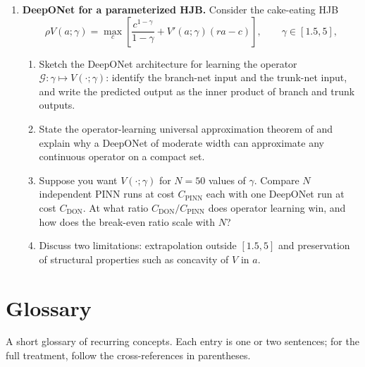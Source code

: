 \documentclass[11pt,a4paper]{report}
\begin{document}
\begin{enumerate}[itemsep=4pt, leftmargin=*]
\begin{enumerate}[label=(\roman*), itemsep=2pt]
\end{enumerate}
Report the wall-clock time of each step, total pipeline time, estimation errors, and a comparison to a naive SMM that re-solves the DEQN at each candidate $(\beta,\alpha)$.  Evaluate whether the surrogate-based optimization is faster after accounting for the one-time GP fitting overhead and whether its accuracy is comparable.  Bonus: bootstrap confidence intervals for $(\hat\beta,\hat\alpha)$ using the parametric bootstrap of Exercise~\ref{ex:ch10:6}.
\item\label{ex:ch12:6} \textbf{DeepONet for a parameterized HJB.}  Consider the cake-eating HJB
\[
\rho V(a; \gamma) = \max_c \left[\frac{c^{1-\gamma}}{1-\gamma} + V'(a; \gamma)(ra - c)\right],
\qquad \gamma \in [1.5,5],
\]
\begin{enumerate}[label=(\roman*), itemsep=2pt]
\item Sketch the DeepONet architecture for learning the operator $\mathcal{G}: \gamma \mapsto V(\cdot;\gamma)$: identify the branch-net input and the trunk-net input, and write the predicted output as the inner product of branch and trunk outputs.
\item State the operator-learning universal approximation theorem of \citet{lu2021learning} and explain why a DeepONet of moderate width can approximate any continuous operator on a compact set.
\item Suppose you want $V(\cdot;\gamma)$ for $N=50$ values of $\gamma$.  Compare $N$ independent PINN runs at cost $C_\mathrm{PINN}$ each with one DeepONet run at cost $C_\mathrm{DON}$.  At what ratio $C_\mathrm{DON}/C_\mathrm{PINN}$ does operator learning win, and how does the break-even ratio scale with $N$?
\item Discuss two limitations: extrapolation outside $[1.5,5]$ and preservation of structural properties such as concavity of $V$ in $a$.
\end{enumerate}
\end{enumerate}

\appendix

\chapter{Glossary}
\label{ch:glossary}

A short glossary of recurring concepts.  Each entry is one or two sentences; for the full treatment, follow the cross-references in parentheses.
\end{document}
